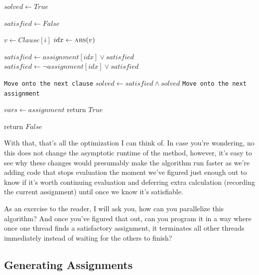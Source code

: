 \begin{algorithm}[H]
\caption{Brute Force}\label{alg:5}
\begin{algorithmic}[1]

    \State $solved \gets True$

        \State $satisfied \gets False$

            \State $v \gets Clause[i]$
            \State $idx \gets \Call{abs}{v}$

                \State $satisfied \gets assignment[idx] \vee satisfied$
            \Else 
                \State $satisfied \gets \neg assignment[idx] \vee satisfied$
            \EndIf

                \State \texttt{Move onto the next clause}
            \EndIf
        \EndFor
        \State $solved \gets satisfied \wedge solved$
            \State \texttt{Move onto the next assignment}
        \EndIf
    \EndFor

        \State $vars \gets assignment$
        \State return $True$
    \EndIf
\EndFor

\State return $False$
\EndProcedure
\end{algorithmic}
\end{algorithm}


With that, that's all the optimization I can think of. In case you're
wondering, no this does not change the asymptotic runtime of the method,
however, it's easy to see why these changes would presumably make the
algorithm run faster as we're adding code that stops evaluation the moment
we've figured just enough out to know if it's worth continuing evaluation and
deferring extra calculation (recording the current assignment) until once we
know it's satisfiable.

As an exercise to the reader, I will ask you, how can you parallelize this
algorithm? And once you've figured that out, can you program it in a way
where once one thread finds a satisfactory assignment, it terminates all other
threads immediately instead of waiting for the others to finish?

\subsection{Generating Assignments}

